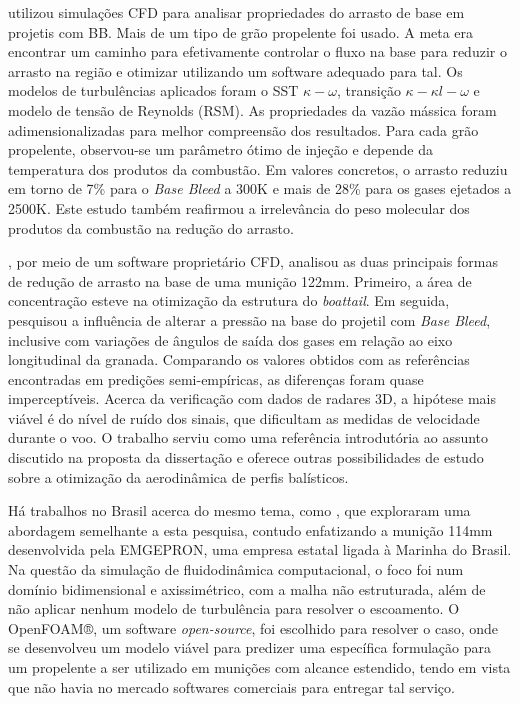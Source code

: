 \citeauthor{Dali2018a} utilizou simulações CFD para analisar propriedades do arrasto de base em projetis com BB. Mais de um tipo de grão propelente foi usado. A meta era encontrar um caminho para efetivamente controlar o fluxo na base para reduzir o arrasto na região e otimizar utilizando um software adequado para tal. Os modelos de turbulências aplicados foram o SST $\kappa-\omega$, transição $\kappa-\kappa l-\omega$ e modelo de tensão de Reynolds (RSM). As propriedades da vazão mássica foram adimensionalizadas para melhor compreensão dos resultados. Para cada grão propelente, observou-se um parâmetro ótimo de injeção e depende da temperatura dos produtos da combustão. Em valores concretos, o arrasto reduziu em torno de 7\% para o \textit{Base Bleed} a 300K e mais de 28\% para os gases ejetados a 2500K. Este estudo também reafirmou a irrelevância do peso molecular dos produtos da combustão na redução do arrasto.
	
\citeauthor{Dali2018b}, por meio de um software proprietário CFD, analisou as duas principais formas de redução de arrasto na base de uma munição 122mm. Primeiro, a área de concentração esteve na otimização da estrutura do \textit{boattail}. Em seguida, pesquisou a influência de alterar a pressão na base do projetil com \textit{Base Bleed}, inclusive com variações de ângulos de saída dos gases em relação ao eixo longitudinal da granada. Comparando os valores obtidos com as referências encontradas em predições semi-empíricas, as diferenças foram quase imperceptíveis. Acerca da verificação com dados de radares 3D, a hipótese mais viável é do nível de ruído dos sinais, que dificultam as medidas de velocidade durante o voo. O trabalho serviu como uma referência introdutória ao assunto discutido na proposta da dissertação e oferece outras possibilidades de estudo sobre a otimização da aerodinâmica de perfis balísticos. 
	
Há trabalhos no Brasil acerca do mesmo tema, como \cite{Lucena2020,Rosendo2020,Gil2020}, que exploraram uma abordagem semelhante a esta pesquisa, contudo enfatizando a munição 114mm desenvolvida pela EMGEPRON, uma empresa estatal ligada à Marinha do Brasil. Na questão da simulação de fluidodinâmica computacional, o foco foi num domínio bidimensional e axissimétrico, com a malha não estruturada, além de não aplicar nenhum modelo de turbulência para resolver o escoamento. O OpenFOAM®, um software \textit{open-source}, foi escolhido para resolver o caso, onde se desenvolveu um modelo viável para predizer uma específica formulação para um propelente a ser utilizado em munições com alcance estendido, tendo em vista que não havia no mercado softwares comerciais para entregar tal serviço. 

